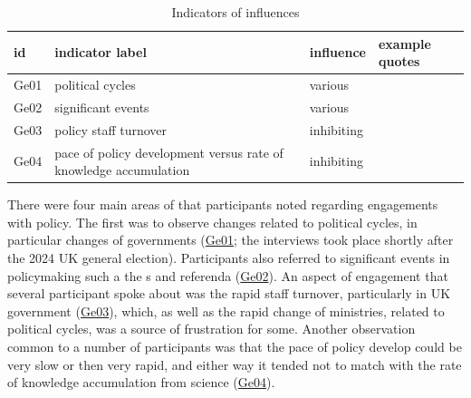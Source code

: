 \begin{table}[!ht]
\footnotesize
\caption{Indicators of \skieven{} influences}\label{tab:resskieven}
\begin{tabular}{L{.07\linewidth}L{.3\linewidth}L{.11\linewidth}L{.52\linewidth}} \hline
\textbf{id} & \textbf{indicator label} & \textbf{influence} & \textbf{example quotes} \\ \hline \hline 
Ge01 & political cycles & various &  \\
Ge02 & significant events & various &  \\
Ge03 & policy staff turnover & inhibiting &  \\
Ge04 & pace of policy development versus rate of knowledge accumulation & inhibiting &  \\
\hline
\end{tabular}
\end{table}

There were four main areas of \skieven{} that participants noted regarding engagements with policy. The first was to observe changes related to political cycles, in particular changes of governments (\hyperref[tab:resskieven]{Ge01}; the interviews took place shortly after the 2024 UK general election). Participants also referred to significant events in policymaking such a the \COP s and referenda (\hyperref[tab:resskieven]{Ge02}). An aspect of engagement that several participant spoke about was the rapid staff turnover, particularly in UK government (\hyperref[tab:resskieven]{Ge03}), which, as well as the rapid change of ministries, related to political cycles, was a source of frustration for some. Another observation common to a number of participants was that the pace of policy develop could be very slow or then very rapid, and either way it tended not to match with the rate of knowledge accumulation from science (\hyperref[tab:resskieven]{Ge04}). 

